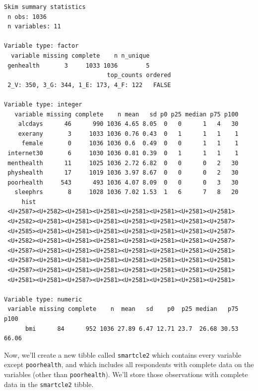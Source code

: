 \documentclass[]{book}
\newenvironment{Shaded}{\begin{snugshade}}{\end{snugshade}}
\newcommand{\KeywordTok}[1]{\textcolor[rgb]{0.13,0.29,0.53}{\textbf{#1}}}
\newcommand{\StringTok}[1]{\textcolor[rgb]{0.31,0.60,0.02}{#1}}
\newcommand{\OperatorTok}[1]{\textcolor[rgb]{0.81,0.36,0.00}{\textbf{#1}}}
\newcommand{\NormalTok}[1]{#1}
\theoremstyle{definition}
\theoremstyle{definition}
\theoremstyle{definition}
\theoremstyle{remark}
\begin{document}
\begin{verbatim}
Skim summary statistics
 n obs: 1036 
 n variables: 11 

Variable type: factor 
  variable missing complete    n n_unique
 genhealth       3     1033 1036        5
                             top_counts ordered
 2_V: 350, 3_G: 344, 1_E: 173, 4_F: 122   FALSE

Variable type: integer 
   variable missing complete    n mean   sd p0 p25 median p75 p100
    alcdays      46      990 1036 4.65 8.05  0   0      1   4   30
    exerany       3     1033 1036 0.76 0.43  0   1      1   1    1
     female       0     1036 1036 0.6  0.49  0   0      1   1    1
 internet30       6     1030 1036 0.81 0.39  0   1      1   1    1
 menthealth      11     1025 1036 2.72 6.82  0   0      0   2   30
 physhealth      17     1019 1036 3.97 8.67  0   0      0   2   30
 poorhealth     543      493 1036 4.07 8.09  0   0      0   3   30
   sleephrs       8     1028 1036 7.02 1.53  1   6      7   8   20
     hist
 <U+2587><U+2582><U+2581><U+2581><U+2581><U+2581><U+2581><U+2581>
 <U+2582><U+2581><U+2581><U+2581><U+2581><U+2581><U+2581><U+2587>
 <U+2585><U+2581><U+2581><U+2581><U+2581><U+2581><U+2581><U+2587>
 <U+2582><U+2581><U+2581><U+2581><U+2581><U+2581><U+2581><U+2587>
 <U+2587><U+2581><U+2581><U+2581><U+2581><U+2581><U+2581><U+2581>
 <U+2587><U+2581><U+2581><U+2581><U+2581><U+2581><U+2581><U+2581>
 <U+2587><U+2581><U+2581><U+2581><U+2581><U+2581><U+2581><U+2581>
 <U+2581><U+2581><U+2587><U+2581><U+2581><U+2581><U+2581><U+2581>

Variable type: numeric 
 variable missing complete    n  mean   sd    p0  p25 median   p75  p100
      bmi      84      952 1036 27.89 6.47 12.71 23.7  26.68 30.53 66.06
\end{verbatim}

Now, we'll create a new tibble called \texttt{smartcle2} which contains
every variable except \texttt{poorhealth}, and which includes all
respondents with complete data on the variables (other than
\texttt{poorhealth}). We'll store those observations with complete data
in the \texttt{smartcle2} tibble.

\begin{Shaded}
\end{Shaded}
\end{document}
